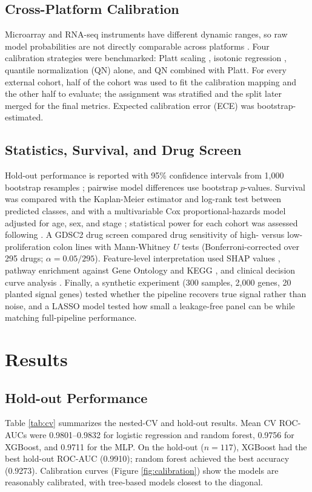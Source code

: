 \documentclass[12pt]{article}
\begin{document}
\subsection{Cross-Platform Calibration}
Microarray and RNA-seq instruments have different dynamic ranges, so raw model probabilities are not directly comparable across platforms \citep{vanclaster2019}. Four calibration strategies were benchmarked: Platt scaling \citep{platt1999}, isotonic regression \citep{zadrozny2002,niculescu2005}, quantile normalization (QN) alone, and QN combined with Platt. For every external cohort, half of the cohort was used to fit the calibration mapping and the other half to evaluate; the assignment was stratified and the split later merged for the final metrics. Expected calibration error (ECE) was bootstrap-estimated.

\subsection{Statistics, Survival, and Drug Screen}
Hold-out performance is reported with 95\% confidence intervals from 1,000 bootstrap resamples \citep{efron1993}; pairwise model differences use bootstrap $p$-values. Survival was compared with the Kaplan-Meier estimator and log-rank test \citep{kaplan1958} between predicted classes, and with a multivariable Cox proportional-hazards model adjusted for age, sex, and stage \citep{cox1972}; statistical power for each cohort was assessed following \citet{schoenfeld1983}. A GDSC2 drug screen \citep{yang2013,iorio2016} compared drug sensitivity of high- versus low-proliferation colon lines with Mann-Whitney $U$ tests \citep{mann1947} (Bonferroni-corrected over 295 drugs; $\alpha = 0.05/295$). Feature-level interpretation used SHAP values \citep{lundberg2017}, pathway enrichment \citep{subramanian2005} against Gene Ontology \citep{ashburner2000} and KEGG \citep{kanehisa2000}, and clinical decision curve analysis \citep{vickers2006}. Finally, a synthetic experiment (300 samples, 2,000 genes, 20 planted signal genes) tested whether the pipeline recovers true signal rather than noise, and a LASSO model \citep{tibshirani1996} tested how small a leakage-free panel can be while matching full-pipeline performance.

\section{Results}

\subsection{Hold-out Performance}
Table \ref{tab:cv} summarizes the nested-CV and hold-out results. Mean CV ROC-AUCs were 0.9801--0.9832 for logistic regression and random forest, 0.9756 for XGBoost, and 0.9711 for the MLP. On the hold-out ($n = 117$), XGBoost had the best hold-out ROC-AUC (0.9910); random forest achieved the best accuracy (0.9273). Calibration curves (Figure \ref{fig:calibration}) show the models are reasonably calibrated, with tree-based models closest to the diagonal.
\end{document}
